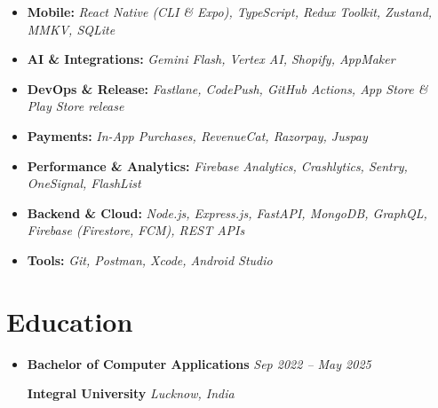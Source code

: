 \documentclass[a4paper,11pt]{article}
\begin{document}
\begin{itemize}[leftmargin=*]

\item
\textbf{Mobile:}
\textit{React Native (CLI \& Expo), TypeScript, Redux Toolkit, Zustand, MMKV, SQLite}

\item
\textbf{AI \& Integrations:}
\textit{Gemini Flash, Vertex AI, Shopify, AppMaker}

\item
\textbf{DevOps \& Release:}
\textit{Fastlane, CodePush, GitHub Actions, App Store \& Play Store release}

\item
\textbf{Payments:}
\textit{In-App Purchases, RevenueCat, Razorpay, Juspay}

\item
\textbf{Performance \& Analytics:}
\textit{Firebase Analytics, Crashlytics, Sentry, OneSignal, FlashList}

\item
\textbf{Backend \& Cloud:}
\textit{Node.js, Express.js, FastAPI, MongoDB, GraphQL, Firebase (Firestore, FCM), REST APIs}

\item
\textbf{Tools:}
\textit{Git, Postman, Xcode, Android Studio}

\end{itemize}

\section*{Education}

\begin{itemize}[leftmargin=*]

\item
\textbf{Bachelor of Computer Applications}
\hfill
\textit{Sep 2022 -- May 2025}

\textbf{Integral University}
\hfill
\textit{Lucknow, India}

\end{itemize}
\end{document}
